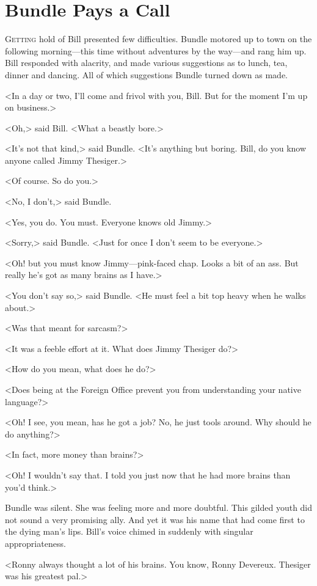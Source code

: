 \chapter{Bundle Pays a Call}

\lettrine{G}{etting} hold of Bill presented few difficulties. Bundle motored up to town on the following morning—this time without adventures by the way—and rang him up. Bill responded with alacrity, and made various suggestions as to lunch, tea, dinner and dancing. All of which suggestions Bundle turned down as made.

<In a day or two, I'll come and frivol with you, Bill. But for the moment I'm up on business.>

<Oh,> said Bill. <What a beastly bore.>

<It's not that kind,> said Bundle. <It's anything but boring. Bill, do you know anyone called Jimmy Thesiger.>

<Of course. So do you.>

<No, I don't,> said Bundle.

<Yes, you do. You must. Everyone knows old Jimmy.>

<Sorry,> said Bundle. <Just for once I don't seem to be everyone.>

<Oh! but you must know Jimmy—pink-faced chap. Looks a bit of an ass. But really he's got as many brains as I have.>

<You don't say so,> said Bundle. <He must feel a bit top heavy when he walks about.>

<Was that meant for sarcasm?>

<It was a feeble effort at it. What does Jimmy Thesiger do?>

<How do you mean, what does he do?>

<Does being at the Foreign Office prevent you from understanding your native language?>

<Oh! I see, you mean, has he got a job? No, he just tools around. Why should he do anything?>

<In fact, more money than brains?>

<Oh! I wouldn't say that. I told you just now that he had more brains than you'd think.>

Bundle was silent. She was feeling more and more doubtful. This gilded youth did not sound a very promising ally. And yet it was his name that had come first to the dying man's lips. Bill's voice chimed in suddenly with singular appropriateness.

<Ronny always thought a lot of his brains. You know, Ronny Devereux. Thesiger was his greatest pal.>

